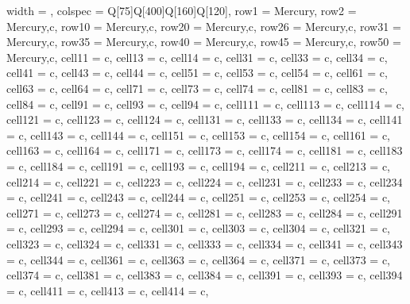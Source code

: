 \begin{longtblr}
[
caption={Tabela de requisitos funcionais},
label={tab:1},
]
{
 width = \linewidth,
 colspec = {Q[75]Q[400]Q[160]Q[120]},
 row{1} = {Mercury},
 row{2} = {Mercury,c},
 row{10} = {Mercury,c},
 row{20} = {Mercury,c},
 row{26} = {Mercury,c},
 row{31} = {Mercury,c},
 row{35} = {Mercury,c},
 row{40} = {Mercury,c},
 row{45} = {Mercury,c},
 row{50} = {Mercury,c},
 cell{1}{1} = {c},
 cell{1}{3} = {c},
 cell{1}{4} = {c},
 cell{3}{1} = {c},
 cell{3}{3} = {c},
 cell{3}{4} = {c},
 cell{4}{1} = {c},
 cell{4}{3} = {c},
 cell{4}{4} = {c},
 cell{5}{1} = {c},
 cell{5}{3} = {c},
 cell{5}{4} = {c},
 cell{6}{1} = {c},
 cell{6}{3} = {c},
 cell{6}{4} = {c},
 cell{7}{1} = {c},
 cell{7}{3} = {c},
 cell{7}{4} = {c},
 cell{8}{1} = {c},
 cell{8}{3} = {c},
 cell{8}{4} = {c},
 cell{9}{1} = {c},
 cell{9}{3} = {c},
 cell{9}{4} = {c},
 cell{11}{1} = {c},
 cell{11}{3} = {c},
 cell{11}{4} = {c},
 cell{12}{1} = {c},
 cell{12}{3} = {c},
 cell{12}{4} = {c},
 cell{13}{1} = {c},
 cell{13}{3} = {c},
 cell{13}{4} = {c},
 cell{14}{1} = {c},
 cell{14}{3} = {c},
 cell{14}{4} = {c},
 cell{15}{1} = {c},
 cell{15}{3} = {c},
 cell{15}{4} = {c},
 cell{16}{1} = {c},
 cell{16}{3} = {c},
 cell{16}{4} = {c},
 cell{17}{1} = {c},
 cell{17}{3} = {c},
 cell{17}{4} = {c},
 cell{18}{1} = {c},
 cell{18}{3} = {c},
 cell{18}{4} = {c},
 cell{19}{1} = {c},
 cell{19}{3} = {c},
 cell{19}{4} = {c},
 cell{21}{1} = {c},
 cell{21}{3} = {c},
 cell{21}{4} = {c},
 cell{22}{1} = {c},
 cell{22}{3} = {c},
 cell{22}{4} = {c},
 cell{23}{1} = {c},
 cell{23}{3} = {c},
 cell{23}{4} = {c},
 cell{24}{1} = {c},
 cell{24}{3} = {c},
 cell{24}{4} = {c},
 cell{25}{1} = {c},
 cell{25}{3} = {c},
 cell{25}{4} = {c},
 cell{27}{1} = {c},
 cell{27}{3} = {c},
 cell{27}{4} = {c},
 cell{28}{1} = {c},
 cell{28}{3} = {c},
 cell{28}{4} = {c},
 cell{29}{1} = {c},
 cell{29}{3} = {c},
 cell{29}{4} = {c},
 cell{30}{1} = {c},
 cell{30}{3} = {c},
 cell{30}{4} = {c},
 cell{32}{1} = {c},
 cell{32}{3} = {c},
 cell{32}{4} = {c},
 cell{33}{1} = {c},
 cell{33}{3} = {c},
 cell{33}{4} = {c},
 cell{34}{1} = {c},
 cell{34}{3} = {c},
 cell{34}{4} = {c},
 cell{36}{1} = {c},
 cell{36}{3} = {c},
 cell{36}{4} = {c},
 cell{37}{1} = {c},
 cell{37}{3} = {c},
 cell{37}{4} = {c},
 cell{38}{1} = {c},
 cell{38}{3} = {c},
 cell{38}{4} = {c},
 cell{39}{1} = {c},
 cell{39}{3} = {c},
 cell{39}{4} = {c},
 cell{41}{1} = {c},
 cell{41}{3} = {c},
 cell{41}{4} = {c},
}
\end{longtblr}
